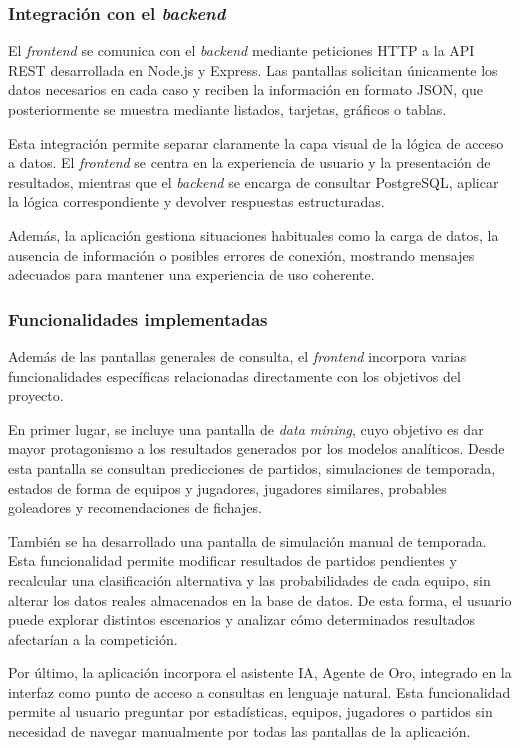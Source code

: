 \subsubsection{Integración con el \textit{backend}}

El \textit{frontend} se comunica con el \textit{backend} mediante peticiones HTTP a la API REST desarrollada en Node.js y Express. Las pantallas solicitan únicamente los datos necesarios en cada caso y reciben la información en formato JSON, que posteriormente se muestra mediante listados, tarjetas, gráficos o tablas.

Esta integración permite separar claramente la capa visual de la lógica de acceso a datos. El \textit{frontend} se centra en la experiencia de usuario y la presentación de resultados, mientras que el \textit{backend} se encarga de consultar PostgreSQL, aplicar la lógica correspondiente y devolver respuestas estructuradas.

Además, la aplicación gestiona situaciones habituales como la carga de datos, la ausencia de información o posibles errores de conexión, mostrando mensajes adecuados para mantener una experiencia de uso coherente.

\subsubsection{Funcionalidades implementadas}

Además de las pantallas generales de consulta, el \textit{frontend} incorpora varias funcionalidades específicas relacionadas directamente con los objetivos del proyecto.

En primer lugar, se incluye una pantalla de \textit{data mining}, cuyo objetivo es dar mayor protagonismo a los resultados generados por los modelos analíticos. Desde esta pantalla se consultan predicciones de partidos, simulaciones de temporada, estados de forma de equipos y jugadores, jugadores similares, probables goleadores y recomendaciones de fichajes.

También se ha desarrollado una pantalla de simulación manual de temporada. Esta funcionalidad permite modificar resultados de partidos pendientes y recalcular una clasificación alternativa y las probabilidades de cada equipo, sin alterar los datos reales almacenados en la base de datos. De esta forma, el usuario puede explorar distintos escenarios y analizar cómo determinados resultados afectarían a la competición.

Por último, la aplicación incorpora el asistente IA, Agente de Oro, integrado en la interfaz como punto de acceso a consultas en lenguaje natural. Esta funcionalidad permite al usuario preguntar por estadísticas, equipos, jugadores o partidos sin necesidad de navegar manualmente por todas las pantallas de la aplicación.
